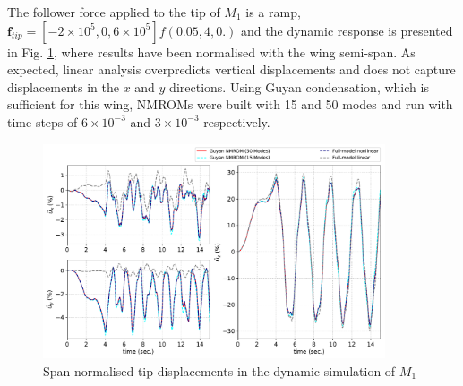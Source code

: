\documentclass[11pt]{article}
\begin{document}
The follower force applied to the tip of $M_1$ is a ramp, $\pmb{f}_{tip}= [-2\times 10^5,0,6\times 10^5]f(0.05,4,0.)$ and the dynamic response is presented in Fig. \ref{fig:sp_results}, where results have been normalised with the wing semi-span. As expected, linear analysis overpredicts vertical displacements and does not capture displacements in the $x$ and $y$ directions. Using Guyan condensation, which is sufficient for this wing, NMROMs were built with 15 and 50 modes and run with time-steps of $6 \times 10^{-3}$ and $3 \times 10^{-3}$ respectively. 

\begin{figure}[h!]
\centering
\includegraphics[width=0.9\textwidth]{./img/wingSP11}
\caption{Span-normalised tip displacements in the dynamic simulation of $M_1$}\label{fig:sp_results}
\end{figure}
\end{document}
